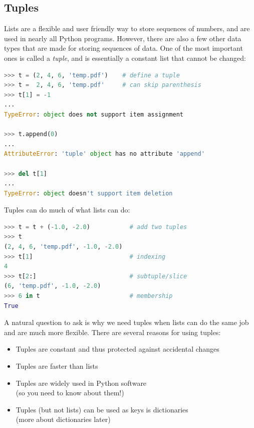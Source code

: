 \documentclass[graybox,envcountchap,sectrefs,final]{svmonodo}
\begin{document}
\subsection{Tuples}
Lists are a flexible and user friendly way to store sequences of numbers, and are used in nearly all
Python programs. However, there are also a few other data types that are made for storing sequences of
data. One of the most important ones is called a \emph{tuple}, and is essentially a constant list that cannot
be changed:
\begin{lstlisting}[language=Python,style=blue1]
>>> t = (2, 4, 6, 'temp.pdf')    # define a tuple
>>> t =  2, 4, 6, 'temp.pdf'     # can skip parenthesis
>>> t[1] = -1
...
TypeError: object does not support item assignment

>>> t.append(0)
...
AttributeError: 'tuple' object has no attribute 'append'

>>> del t[1]
...
TypeError: object doesn't support item deletion
\end{lstlisting}

Tuples can do much of what lists can do:

\begin{lstlisting}[language=Python,style=blue1]
>>> t = t + (-1.0, -2.0)           # add two tuples
>>> t
(2, 4, 6, 'temp.pdf', -1.0, -2.0)
>>> t[1]                           # indexing
4
>>> t[2:]                          # subtuple/slice
(6, 'temp.pdf', -1.0, -2.0)
>>> 6 in t                         # membership
True
\end{lstlisting}
A natural question to ask is why we need tuples when lists can do the same job and are
much more flexible. There are several reasons for using tuples:

\begin{itemize}
  \item Tuples are constant and thus protected against accidental changes

  \item Tuples are faster than lists

  \item Tuples are widely used in Python software\\
    (so you need to know about them!)

  \item Tuples (but not lists) can be used as keys is dictionaries\\
    (more about dictionaries later)
\end{itemize}
\end{document}
